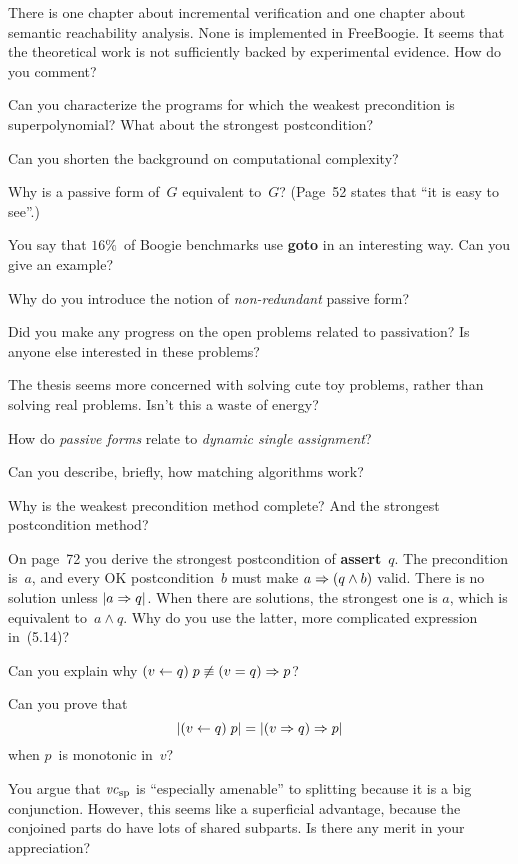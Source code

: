 \Q There is one chapter about incremental verification and one chapter
about semantic reachability analysis. None is implemented in FreeBoogie. It
seems that the theoretical work is not sufficiently backed by experimental
evidence.  How do you comment?

\Q Can you characterize the programs for which the weakest precondition is
superpolynomial? What about the strongest postcondition?

\Q Can you shorten the background on computational complexity?


\Q Why is a passive form of~$G$ equivalent to~$G$? (Page~52 states that ``it
is easy to see''.)

\Q You say that $16\%$~of Boogie benchmarks use {\bf goto} in an
interesting way. Can you give an example?

\Q Why do you introduce the notion of {\it non-redundant\/} passive
form?


\Q Did you make any progress on the open problems related to passivation?
Is anyone else interested in these problems?

\Q The thesis seems more concerned with solving cute toy problems, rather
than solving real problems. Isn't this a waste of energy?

\Q How do {\it passive forms\/} relate to {\it dynamic single assignment\/}?

\Q Can you describe, briefly, how matching algorithms work?

\Q Why is the weakest precondition method complete? And the strongest
postcondition method?

\Q On page~72 you derive the strongest postcondition of {\bf assert}~$q$.
The precondition is~$a$, and every OK postcondition~$b$ must make $a\Rightarrow
(q\land b)$ valid. There is no solution unless $|a\Rightarrow q|$.  When there
are solutions, the strongest one is $a$, which is equivalent to~$a\land q$.
Why do you use the latter, more complicated expression in~(5.14)?


\Q Can you explain why $(v\gets q)\;p\not\equiv(v=q)\Rightarrow p$?

\Q Can you prove that $$|(v\gets q)\;p|=|(v\Rightarrow q)\Rightarrow p|$$ when $p$~is
monotonic in~$v$?

\Q You argue that ${\it vc}_{\rm sp}$ is ``especially amenable'' to
splitting because it is a big conjunction. However, this seems like a
superficial advantage, because the conjoined parts do have lots of shared
subparts.  Is there any merit in your appreciation?


\bye
